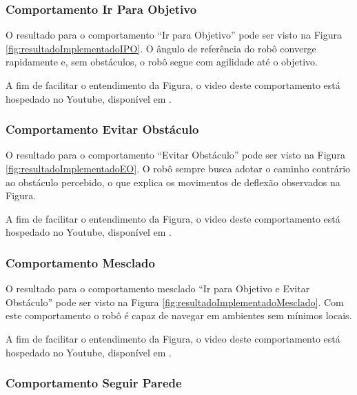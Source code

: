 	\subsubsection{Comportamento Ir Para Objetivo}
	
	O resultado para o comportamento ``Ir para Objetivo'' pode ser visto na Figura
	\ref{fig:resultadoImplementadoIPO}. O ângulo de referência do robô converge rapidamente
	e, sem obstáculos, o robô segue com agilidade até o objetivo.
	
	
	
	A fim de facilitar o entendimento da Figura, o video deste comportamento está 
	hospedado no Youtube, disponível em .
	
	\subsubsection{Comportamento Evitar Obstáculo}
	
	O resultado para o comportamento ``Evitar Obstáculo'' pode ser visto na Figura	
	\ref{fig:resultadoImplementadoEO}. O robô sempre busca adotar o caminho contrário
	ao obstáculo percebido, o que explica os movimentos de deflexão observados na Figura.
	
	
	
	A fim de facilitar o entendimento da Figura, o video deste comportamento está 
	hospedado no Youtube, disponível em .
	
	\subsubsection{Comportamento Mesclado}
	
	O resultado para o comportamento mesclado ``Ir para Objetivo e Evitar Obstáculo'' pode 
	ser visto na Figura \ref{fig:resultadoImplementadoMesclado}. Com este comportamento
	o robô é capaz de navegar em ambientes sem mínimos locais.   
	
	
	
	A fim de facilitar o entendimento da Figura, o video deste comportamento está 
	hospedado no Youtube, disponível em .
	
	\subsubsection{Comportamento Seguir Parede}
	
